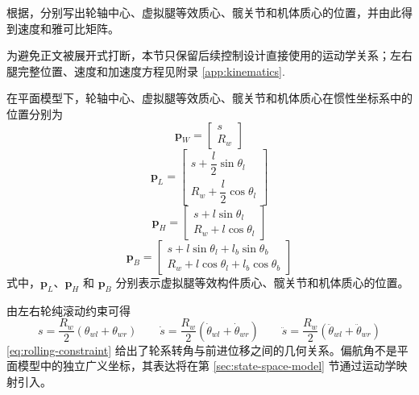 根据，分别写出轮轴中心、虚拟腿等效质心、髋关节和机体质心的位置，并由此得到速度和雅可比矩阵。

为避免正文被展开式打断，本节只保留后续控制设计直接使用的运动学关系；左右腿完整位置、速度和加速度方程见附录 \ref{app:kinematics}.

在平面模型下，轮轴中心、虚拟腿等效质心、髋关节和机体质心在惯性坐标系中的位置分别为
\begin{equation}
  \boldsymbol{p}_W =
  \begin{bmatrix}
    s \\
    R_w
  \end{bmatrix}
  \label{eq:w-pos}
\end{equation}
\begin{equation}
  \boldsymbol{p}_L =
  \begin{bmatrix}
    s + \dfrac{l}{2}\sin\theta_l \\
    R_w + \dfrac{l}{2}\cos\theta_l
  \end{bmatrix}
  \label{eq:l-pos}
\end{equation}
\begin{equation}
  \boldsymbol{p}_H =
  \begin{bmatrix}
    s + l\sin\theta_l \\
    R_w + l\cos\theta_l
  \end{bmatrix}
  \label{eq:h-pos}
\end{equation}
\begin{equation}
  \boldsymbol{p}_B =
  \begin{bmatrix}
    s + l\sin\theta_l + l_b\sin\theta_b \\
    R_w + l\cos\theta_l + l_b\cos\theta_b
  \end{bmatrix}
  \label{eq:b-pos}
\end{equation}
式中，$\boldsymbol{p}_L$、$\boldsymbol{p}_H$ 和 $\boldsymbol{p}_B$ 分别表示虚拟腿等效构件质心、髋关节和机体质心的位置。

由左右轮纯滚动约束可得
\begin{equation}
  s = \frac{R_w}{2}\left(\theta_{wl} + \theta_{wr}\right)\qquad
  \dot{s} = \frac{R_w}{2}\left(\dot{\theta}_{wl} + \dot{\theta}_{wr}\right)\qquad
  \ddot{s} = \frac{R_w}{2}\left(\ddot{\theta}_{wl} + \ddot{\theta}_{wr}\right)
  \label{eq:rolling-constraint}
\end{equation}
\eqref{eq:rolling-constraint} 给出了轮系转角与前进位移之间的几何关系。偏航角不是平面模型中的独立广义坐标，其表达将在第 \ref{sec:state-space-model} 节通过运动学映射引入。

